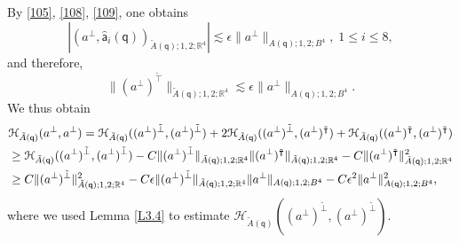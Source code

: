 \documentclass[11pt]{article}
\numberwithin{equation}{section} \setlength{\topmargin}{-35pt}
\newcommand{\R}{\mathbb{R}}
\newcommand{\q}{\mathsf{q}}
\newcommand{\A}{\mathsf{a}}
\newcommand{\ttilde}{\tilde{\intercal}}
\newcommand{\tperp}{\tilde{\perp}}
\begin{document}
By \eqref{105}, \eqref{108}, \eqref{109}, one obtains
\begin{equation}
\label{110}
|(a^{\perp},\hat{\A}_i(\q))_{\tilde{A}(\q);1,2;\R^4}|\lesssim\epsilon\|a^{\perp}\|_{A(\q);1,2;B^4},\;1\le
i\le 8,
\end{equation}
and therefore,
\begin{equation}
 \label{111}
\|(a^{\perp})^{\ttilde}\|_{\tilde{A}(\q);1,2;\R^4}\lesssim\epsilon\|a^{\perp}\|_{A(\q);1,2;B^4}.
\end{equation}
We thus obtain
\begin{align}
\label{112}
&\mathcal{H}_{\tilde{A}(\q)}(a^{\perp},a^{\perp})=\mathcal{H}_{\tilde{A}(\q)}((a^{\perp})^{\tperp},(a^{\perp})^{\tperp})
+2\mathcal{H}_{\tilde{A}(\q)}((a^{\perp})^{\tperp},(a^{\perp})^{\ttilde})+
\mathcal{H}_{\tilde{A}(\q)}((a^{\perp})^{\ttilde},(a^{\perp})^{\ttilde})\notag\\
&\ge\mathcal{H}_{\tilde{A}(\q)}((a^{\perp})^{\tperp},(a^{\perp})^{\tperp})-
C\|(a^{\perp})^{\tperp}\|_{\tilde{A}(\q);1,2;\R^4}\|(a^{\perp})^{\ttilde}\|_{\tilde{A}(\q);1,2;\R^4}-
C\|(a^{\perp})^{\ttilde}\|_{\tilde{A}(\q);1,2;\R^4}^2\notag\\
&\ge C\|(a^{\perp})^{\tperp}\|^2_{\tilde{A}(\q);1,2;\R^4}-
C\epsilon\|(a^{\perp})^{\tperp}\|_{\tilde{A}(\q);1,2;\R^4}\|a^{\perp}\|_{A(\q);1,2;B^4}-
C\epsilon^2\|a^{\perp}\|_{A(\q);1,2;B^4}^2,
\end{align}
where we used Lemma \ref{L3.4} to estimate
$\mathcal{H}_{\tilde{A}(\q)}((a^{\perp})^{\tperp},(a^{\perp})^{\tperp})$.
\end{document}
